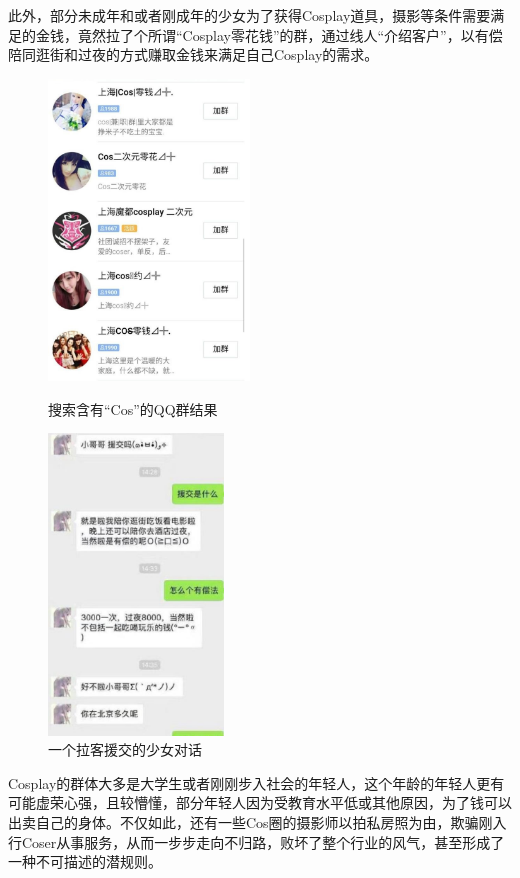 \documentclass[a4paper]{article}
\begin{document}
	此外，部分未成年和或者刚成年的少女为了获得Cosplay道具，摄影等条件需要满足的金钱，竟然拉了个所谓“Cosplay零花钱”的群，通过线人“介绍客户”，以有偿陪同逛街和过夜的方式赚取金钱来满足自己Cosplay的需求。\\
	\begin{figure}[H]
		\centering
		\begin{minipage}[t]{0.48\textwidth}
			\centering
			\includegraphics[height=8cm]{figures/3}
			\caption*{搜索含有“Cos”的QQ群结果}
		\end{minipage}
		\begin{minipage}[t]{0.48\textwidth}
			\centering
			\includegraphics[height=8cm]{figures/4}
			\caption*{一个拉客援交的少女对话}
		\end{minipage}
	\end{figure}
	
	Cosplay的群体大多是大学生或者刚刚步入社会的年轻人，这个年龄的年轻人更有可能虚荣心强，且较懵懂，部分年轻人因为受教育水平低或其他原因，为了钱可以出卖自己的身体。不仅如此，还有一些Cos圈的摄影师以拍私房照为由，欺骗刚入行Coser从事服务，从而一步步走向不归路，败坏了整个行业的风气，甚至形成了一种不可描述的潜规则。\\
	
\end{document}
